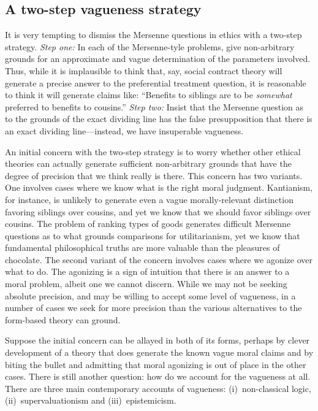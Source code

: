 \subsection{A two-step vagueness strategy}
It is very tempting to dismiss the Mersenne questions in ethics with a two-step strategy. \textit{Step one:} In each of the Mersenne-tyle
problems, give non-arbitrary grounds for 
an approximate and vague determination of the parameters involved. Thus, while it is implausible to think that, say, social contract theory
will generate a precise answer to the preferential treatment question, it is reasonable to think it will generate claims like: ``Benefits to 
siblings are to be \textit{somewhat} preferred to benefits to cousins.'' \textit{Step two:} Insist that the Mersenne question as to the grounds
of the exact dividing line has the false presupposition that there is an exact dividing line---instead, we have insuperable vagueness.

An initial concern with the two-step strategy is to worry whether other ethical theories can actually generate sufficient non-arbitrary grounds
that have the degree of precision that we think really is there. 
This concern has two variants. One involves cases where we know what is the right moral judgment.
Kantianism, for instance, is unlikely to generate even a vague morally-relevant 
distinction favoring siblings over cousins, and yet we know that we should favor siblings over cousins. The problem of ranking types of goods generates difficult 
Mersenne questions as to what grounds comparisons for utilitarianism, yet we know that fundamental philosophical truths are more valuable than the 
pleasures of chocolate. The second variant of the concern involves cases where we agonize over what to do. The agonizing is a sign of intuition
that there is an answer to a moral problem, albeit one we cannot discern. While we may not be seeking absolute precision, and may be willing
to accept some level of vagueness, in a number of cases we seek for more precision than the various alternatives to the form-based theory can ground. 

Suppose the initial concern can be allayed in both of its forms, perhaps by clever development of a theory that does generate
the known vague moral claims and by biting the bullet and admitting that moral agonizing is out of place in the other cases. 
There is still another question: how do we account for the vagueness at all. There are three main contemporary accounts of vagueness:
(i)~non-classical logic, (ii)~supervaluationism and (iii)~epistemicism. 


